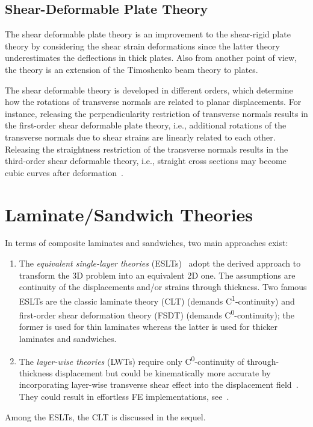 \subsection{Shear-Deformable Plate Theory}
The shear deformable plate theory is an improvement to the shear-rigid plate theory by considering the shear strain deformations since the latter theory underestimates the deflections in thick plates. Also from another point of view, the theory is an extension of the Timoshenko beam theory to plates. 

The shear deformable theory is developed in different orders, which determine how the rotations of transverse normals are related to planar displacements. For instance, releasing the perpendicularity restriction of transverse normals results in the first-order shear deformable plate theory, i.e., additional rotations of the transverse normals due to shear strains are linearly related to each other. Releasing the straightness restriction of the transverse normals results in the third-order shear deformable theory, i.e., straight cross sections may become cubic curves after deformation~\autocite{Reddy.2006}.


\section{Laminate/Sandwich Theories}
	In terms of composite laminates and sandwiches, two main approaches exist:
	\begin{enumerate}
	\item The \textit{equivalent single-layer theories} (ESLTs)~\autocite{Altenbach.2010c} adopt the derived approach to transform the 3D problem into an equivalent 2D one. The assumptions are continuity of the displacements and/or strains through thickness. Two famous ESLTs are the classic laminate theory (CLT) (demands C\textsuperscript{1}-continuity) and first-order shear deformation theory (FSDT) (demands C\textsuperscript{0}-continuity); the former is used for thin laminates whereas the latter is used for thicker laminates and sandwiches.
	\item The \textit{layer-wise theories} (LWTs) require only C\textsuperscript{0}-continuity of through-thickness displacement but could be kinematically more accurate by incorporating layer-wise transverse shear effect into the displacement field~\autocite{Altenbach.2010c}. They could result in effortless FE implementations, see~\autocite{Javanbakht.2019b}.
	\end{enumerate}
	Among the ESLTs, the CLT is discussed in the sequel.

